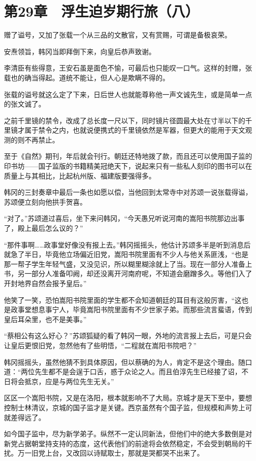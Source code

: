 \section{第29章　浮生迫岁期行旅（八）}

赠了谥号，又加了张载一个从三品的文散官，又有赏赐，可谓是备极哀荣。

安焘领旨，韩冈当即拜倒下来，向皇后恭声致谢。

李清臣有些得意，王安石虽是面色不愉，可最后也只能叹一口气。这样的封赠，张载也的确当得起。道统不能让，但人心是欺瞒不得的。

张载的谥号就这么定了下来，日后世人也就能尊称他一声文诚先生，或是简单一点的张文诚了。

之前千里镜的禁令，改成了总长度一尺以下，同时镜片径圆最大处在寸半以下的千里镜才属于禁令之内，也就说便携式的千里镜依然是军器，但更大的能用于天文观测的则不再禁止。

至于《自然》期刊，年后就会刊行。朝廷还特地拨了款，而且还可以使用国子监的印书坊——国子监版的书籍精美冠绝天下，说起来只有一些私人刻印的图书可以在质量上与其相比，比起杭州版、福建版要强得多。

韩冈的三封奏章中最后一条也如愿以偿，当他回到太常寺中对苏颂一说张载得谥，苏颂便立刻向他拱手贺喜。

“对了。”苏颂道过喜后，坐下来问韩冈，“今天愚兄听说河南的嵩阳书院那边出事了，殿上最后怎么议的？”

“那件事啊……政事堂好像没有报上去。”韩冈摇摇头，他估计苏颂多半是听到消息后就急了半日，毕竟他立场偏近旧党，嵩阳书院里面有不少人与他关系匪浅，“也是那一帮子学生年轻气盛，又没见识，所以糊里糊涂就上了当。现在一部分人准备上书，另一部分人准备叩阙，却还没离开河南府呢，不知道会磨蹭多久。等他们入了开封地界自然会报予皇后。”

他笑了一笑，恐怕嵩阳书院里面的学生都不会知道朝廷的耳目有这般厉害，“这也是政事堂想息事宁人，毕竟嵩阳书院里面有不少世家子弟。而那些流言蜚语，传到皇后耳朵里，也不是美事。”

“蔡相公有这么好心？”苏颂狐疑的看了韩冈一眼，外地的流言报上去后，可是只会让皇后更恨旧党，忽然他有了些明悟，“二程就在嵩阳书院吧？”

韩冈摇摇头，虽然他猜不到具体原因，但以蔡确的为人，肯定不是这个理由。随口道：“两位先生都不是会逞于口舌，惑于众论之人。而且伯淳先生已经接了诏，不日将会抵京，应是与两位先生无关。”

区区一个嵩阳书院，又是在洛阳，根本就影响不了大局。京城才是天下至中，要想控制士林清议，京城的国子监才是关键。西京虽然有个国子监，但规模和声势上可就差得远了。

如今国子监中，尽为新学弟子。纵然不一定认同新法，但他们中的绝大多数倒是对新党占据朝堂持支持的态度，这代表他们的前途将会依然稳定，不会受到朝局的干扰。万一旧党上台，又改回以诗赋取士，那就是哭都哭不出来了。

